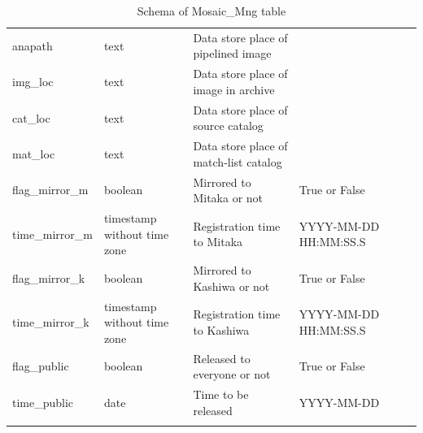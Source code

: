 \documentclass[12pt]{article}
\begin{document}
\begin{table}[thbp]
\begin{center}
{\begin{tabular}{llllll}
anapath & text & Data store place of pipelined image                 &                           &             &             \\
img\_loc & text & Data store place of image in archive                &                           &             &             \\
cat\_loc & text & Data store place of source catalog                  &                           &             &             \\
mat\_loc & text & Data store place of match-list catalog              &                           &             &             \\
flag\_mirror\_m & boolean & Mirrored to Mitaka or not                           & True or False             &             &             \\
time\_mirror\_m & timestamp without time zone & Registration time to Mitaka                         & YYYY-MM-DD HH:MM:SS.S     &             &             \\
flag\_mirror\_k & boolean & Mirrored to Kashiwa or not                          & True or False             &             &             \\
time\_mirror\_k & timestamp without time zone & Registration time to Kashiwa                        & YYYY-MM-DD HH:MM:SS.S     &             &             \\
flag\_public & boolean & Released to everyone or not                         & True or False             &             &             \\
time\_public & date & Time to be released                                 & YYYY-MM-DD                &             &             \\
\hline\\
\end{tabular}
}
\caption{Schema of Mosaic\_Mng table}
\end{center}
\end{table}
\end{document}
